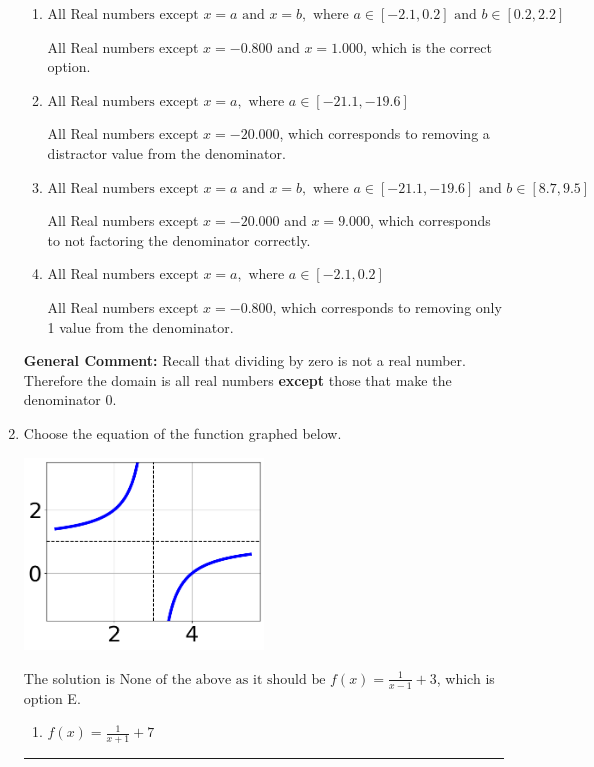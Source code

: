 \documentclass{extbook}[14pt]
\newcommand{\litem}[1]{\item #1

\rule{\textwidth}{0.4pt}}
\begin{document}
\begin{enumerate}
{\begin{enumerate}[label=\Alph*.]
This corresponds to thinking the denominator has complex roots or that rational functions have a domain of all Real numbers.
\item \( \text{All Real numbers except } x = a \text{ and } x = b, \text{ where } a \in [-2.1, 0.2] \text{ and } b \in [0.2, 2.2] \)

All Real numbers except $x = -0.800$ and $x = 1.000$, which is the correct option.
\item \( \text{All Real numbers except } x = a, \text{ where } a \in [-21.1, -19.6] \)

All Real numbers except $x = -20.000$, which corresponds to removing a distractor value from the denominator.
\item \( \text{All Real numbers except } x = a \text{ and } x = b, \text{ where } a \in [-21.1, -19.6] \text{ and } b \in [8.7, 9.5] \)

All Real numbers except $x = -20.000$ and $x = 9.000$, which corresponds to not factoring the denominator correctly.
\item \( \text{All Real numbers except } x = a, \text{ where } a \in [-2.1, 0.2] \)

All Real numbers except $x = -0.800$, which corresponds to removing only 1 value from the denominator.
\end{enumerate}

\textbf{General Comment:} Recall that dividing by zero is not a real number. Therefore the domain is all real numbers \textbf{except} those that make the denominator 0.
}
\litem{
Choose the equation of the function graphed below.

\begin{center}
    \includegraphics[width=0.5\textwidth]{../Figures/rationalGraphToEquationCopyA.png}
\end{center}


The solution is \( \text{None of the above as it should be } f(x) = \frac{1}{x - 1} + 3 \), which is option E.\begin{enumerate}[label=\Alph*.]
\item \( f(x) = \frac{1}{x + 1} + 7 \)


\end{enumerate}}
\end{enumerate}
\end{document}
